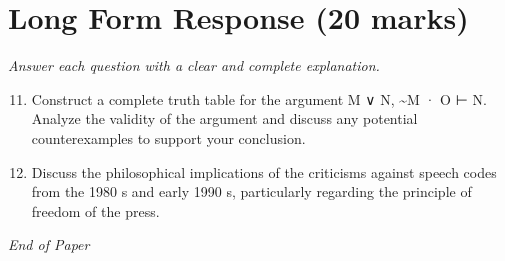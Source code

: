 \documentclass[12pt]{article}
\begin{document}
\section*{Long Form Response (20 marks)}
\textit{Answer each question with a clear and complete explanation.}
\begin{enumerate}[label=\arabic*.]
\setcounter{enumi}{10}
\item Construct a complete truth table for the argument M ∨ N, \textasciitilde{}M · O ⊢ N. Analyze the validity of the argument and discuss any potential counterexamples to support your conclusion.
\item Discuss the philosophical implications of the criticisms against speech codes from the 1980 s and early 1990 s, particularly regarding the principle of freedom of the press.
\end{enumerate}

\vfill
\noindent\textit{End of Paper}
\end{document}
